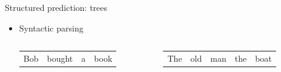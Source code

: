 \documentclass[usenames,dvipsnames,notes,11pt,aspectratio=169]{beamer}
\begin{document}
\begin{frame}
    {Structured prediction: trees}
    \begin{itemize}
        \item Syntactic parsing 
            \vspace{5cm}
            \begin{columns}
                \begin{column}{0.4\linewidth}
                    \begin{tabular}{llll}
                        Bob& bought& a& book
                    \end{tabular}
                \end{column}
                \begin{column}{0.4\linewidth}
                    \begin{tabular}{lllll}
                        The& old& man& the& boat
                    \end{tabular}
                \end{column}
            \end{columns}
    \end{itemize}
\end{frame}

\end{document}
